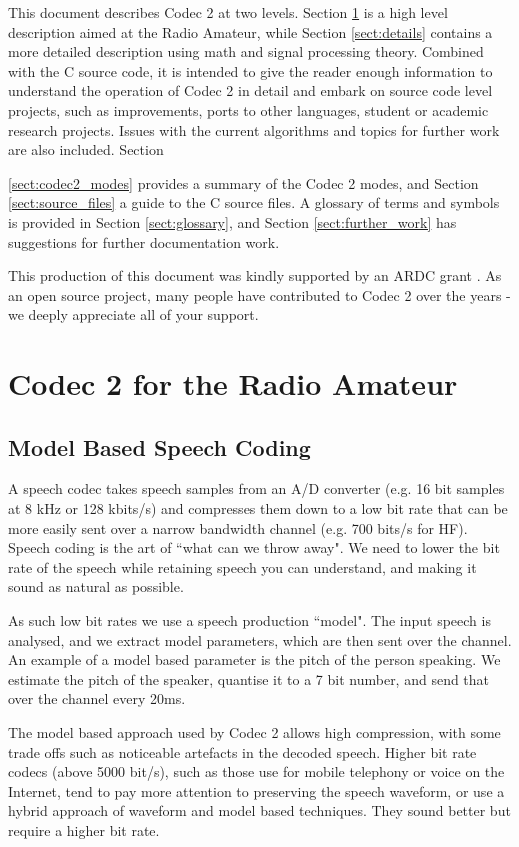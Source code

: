 \documentclass{article}
\begin{document}
This document describes Codec 2 at two levels.  Section \ref{sect:overview} is a high level description aimed at the Radio Amateur, while Section \ref{sect:details} contains a more detailed description using math and signal processing theory.  Combined with the C source code, it is intended to give the reader enough information to understand the operation of Codec 2 in detail and embark on source code level projects, such as improvements, ports to other languages, student or academic research projects.  Issues with the current algorithms and topics for further work are also included.  Section {\ref{sect:codec2_modes} provides a summary of the Codec 2 modes, and Section \ref{sect:source_files} a guide to the C source files.  A glossary of terms and symbols is provided in Section \ref{sect:glossary}, and Section \ref{sect:further_work} has suggestions for further documentation work.

This production of this document was kindly supported by an ARDC grant \cite{ardc2023}.  As an open source project, many people have contributed to Codec 2 over the years - we deeply appreciate all of your support.

\section{Codec 2 for the Radio Amateur}
\label{sect:overview}

\subsection{Model Based Speech Coding}

A speech codec takes speech samples from an A/D converter (e.g. 16 bit samples at 8 kHz or 128 kbits/s) and compresses them down to a low bit rate that can be more easily sent over a narrow bandwidth channel (e.g. 700 bits/s for HF).  Speech coding is the art of ``what can we throw away". We need to lower the bit rate of the speech while retaining speech you can understand, and making it sound as natural as possible.

As such low bit rates we use a speech production ``model".  The input speech is analysed, and we extract model parameters, which are then sent over the channel.  An example of a model based parameter is the pitch of the person speaking.  We estimate the pitch of the speaker, quantise it to a 7 bit number, and send that over the channel every 20ms.

The model based approach used by Codec 2 allows high compression, with some trade offs such as noticeable artefacts in the decoded speech.  Higher bit rate codecs (above 5000 bit/s), such as those use for mobile telephony or voice on the Internet, tend to pay more attention to preserving the speech waveform, or use a hybrid approach of waveform and model based techniques.  They sound better but require a higher bit rate.

}
\end{document}
